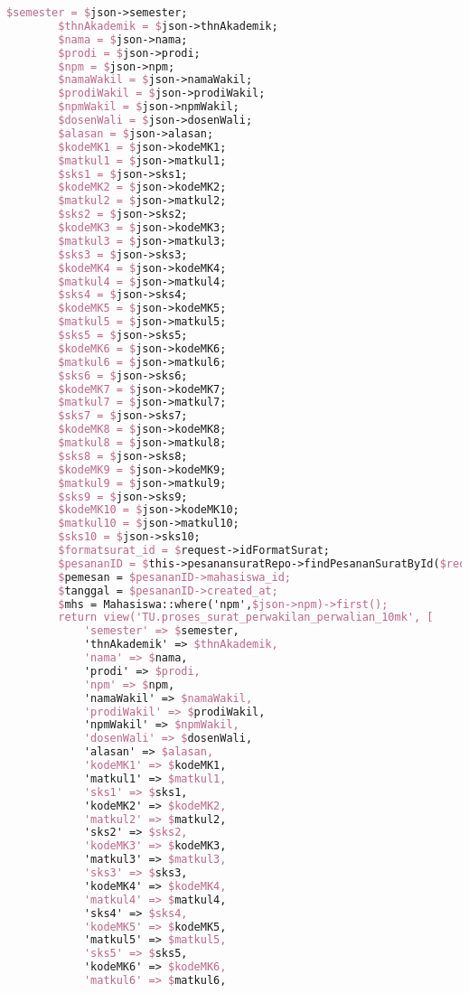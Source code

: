 \begin{lstlisting}[language=tex,basicstyle=\tiny,caption=PesanansuratController.php]
        $semester = $json->semester;
        $thnAkademik = $json->thnAkademik;
        $nama = $json->nama;
        $prodi = $json->prodi;
        $npm = $json->npm;
        $namaWakil = $json->namaWakil;
        $prodiWakil = $json->prodiWakil;
        $npmWakil = $json->npmWakil;
        $dosenWali = $json->dosenWali;
        $alasan = $json->alasan;
        $kodeMK1 = $json->kodeMK1;
        $matkul1 = $json->matkul1;
        $sks1 = $json->sks1;
        $kodeMK2 = $json->kodeMK2;
        $matkul2 = $json->matkul2;
        $sks2 = $json->sks2;
        $kodeMK3 = $json->kodeMK3;
        $matkul3 = $json->matkul3;
        $sks3 = $json->sks3;
        $kodeMK4 = $json->kodeMK4;
        $matkul4 = $json->matkul4;
        $sks4 = $json->sks4;
        $kodeMK5 = $json->kodeMK5;
        $matkul5 = $json->matkul5;
        $sks5 = $json->sks5;
        $kodeMK6 = $json->kodeMK6;
        $matkul6 = $json->matkul6;
        $sks6 = $json->sks6;
        $kodeMK7 = $json->kodeMK7;
        $matkul7 = $json->matkul7;
        $sks7 = $json->sks7;
        $kodeMK8 = $json->kodeMK8;
        $matkul8 = $json->matkul8;
        $sks8 = $json->sks8;
        $kodeMK9 = $json->kodeMK9;
        $matkul9 = $json->matkul9;
        $sks9 = $json->sks9;
        $kodeMK10 = $json->kodeMK10;
        $matkul10 = $json->matkul10;
        $sks10 = $json->sks10;
        $formatsurat_id = $request->idFormatSurat;
        $pesananID = $this->pesanansuratRepo->findPesananSuratById($request->id);
        $pemesan = $pesananID->mahasiswa_id;
        $tanggal = $pesananID->created_at;
        $mhs = Mahasiswa::where('npm',$json->npm)->first();
        return view('TU.proses_surat_perwakilan_perwalian_10mk', [
            'semester' => $semester,
            'thnAkademik' => $thnAkademik,
            'nama' => $nama,
            'prodi' => $prodi,
            'npm' => $npm,
            'namaWakil' => $namaWakil,
            'prodiWakil' => $prodiWakil,
            'npmWakil' => $npmWakil,
            'dosenWali' => $dosenWali,
            'alasan' => $alasan,
            'kodeMK1' => $kodeMK1,
            'matkul1' => $matkul1,
            'sks1' => $sks1,
            'kodeMK2' => $kodeMK2,
            'matkul2' => $matkul2,
            'sks2' => $sks2,
            'kodeMK3' => $kodeMK3,
            'matkul3' => $matkul3,
            'sks3' => $sks3,
            'kodeMK4' => $kodeMK4,
            'matkul4' => $matkul4,
            'sks4' => $sks4,
            'kodeMK5' => $kodeMK5,
            'matkul5' => $matkul5,
            'sks5' => $sks5,
            'kodeMK6' => $kodeMK6,
            'matkul6' => $matkul6,

\end{lstlisting}
